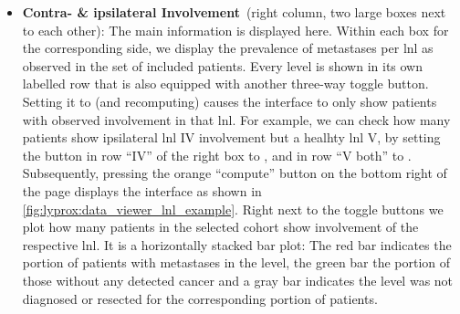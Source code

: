 \documentclass[\relativeRoot/main.tex]{subfiles}
\begin{document}
\begin{itemize}
    \item \textbf{Contra- \& ipsilateral Involvement}~(right column, two large boxes next to each other): The main information is displayed here. Within each box for the corresponding side, we display the prevalence of metastases per \gls{lnl} as observed in the set of included patients. Every level is shown in its own labelled row that is also equipped with another three-way toggle button. Setting it to  (and recomputing) causes the interface to only show patients with observed involvement in that \gls{lnl}. For example, we can check how many patients show ipsilateral \gls{lnl} IV involvement but a healhty \gls{lnl} V, by setting the button in row ``IV'' of the right box to , and in row ``V both'' to . Subsequently, pressing the orange ``compute'' button on the bottom right of the page displays the interface as shown in \cref{fig:lyprox:data_viewer_lnl_example}. Right next to the toggle buttons we plot how many patients in the selected cohort show involvement of the respective \gls{lnl}. It is a horizontally stacked bar plot: The red bar indicates the portion of patients with metastases in the level, the green bar the portion of those without any detected cancer and a gray bar indicates the level was not diagnosed or resected for the corresponding portion of patients.\\
    [3mm]
\end{itemize}
\end{document}
